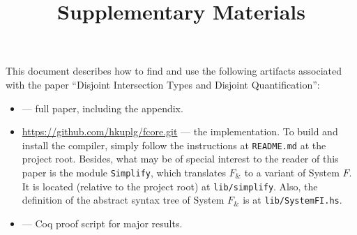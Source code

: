 \documentclass{article}
\begin{document}
\title{Supplementary Materials}
\maketitle

This document describes how to find and use the following artifacts associated
with the paper ``Disjoint Intersection Types and Disjoint Quantification'':

\begin{itemize}
  \item {} --- full paper, including the appendix.

  \item \url{https://github.com/hkuplg/fcore.git} --- the implementation. To build and install the
  compiler, simply follow the instructions at \texttt{README.md} at the project
  root. Besides, what may be of special interest to the reader of this paper is
  the module \texttt{Simplify}, which translates $ F_\&$ to a variant of System
  $F$. It is located (relative to the project root) at \texttt{lib/simplify}.
  Also, the definition of the abstract syntax tree of System $F_\&$ is at
  \texttt{lib/SystemFI.hs}.

  \item {} --- Coq proof script for major results.
\end{itemize}
\end{document}

